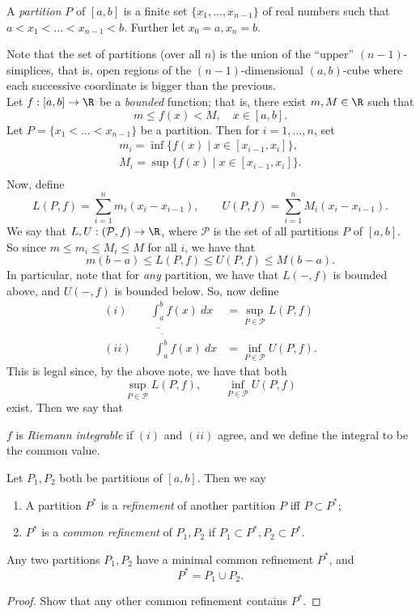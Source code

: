 \documentclass{notes}
\begin{document}
\begin{defn}
  A \emph{partition} $P$ of $[a,b]$ is a finite set $\{x_1, \dots, x_{n-1}\}$ of real numbers such
  that $a < x_1 < \dots < x_{n-1} < b$. Further let $x_0 = a, x_n = b$.
\end{defn}
Note that the set of partitions (over all $n$) is the union of the ``upper'' $(n-1)$-simplices, that
is, open regions of the $(n-1)$-dimensional $(a,b)$-cube where each successive coordinate is bigger
than the previous. \\

Let $f: [a,b] \to \R$ be a \emph{bounded} function; that is, there exist $m, M\in\R$ such that 
$$m \leq f(x) < M, \quad x\in[a,b].$$
Let $P = \{x_1 < \dots < x_{n-1}\}$ be a partition. Then for $i=1, \dots, n$, set 
\begin{gather*}
  m_i = \inf \{f(x) \mid x\in [x_{i-1}, x_i] \}, \\
  M_i = \sup \{f(x) \mid x\in [x_{i-1}, x_i] \}. \\
\end{gather*}
Now, define 
$$L(P, f) = \sum_{i=1}^n m_i (x_i - x_{i-1}), \qquad U(P, f) = \sum_{i=1}^n M_i (x_i - x_{i-1}).$$
We say that $L, U: (\mathcal{P}, f) \to \R$, where $\mathcal{P}$ is the set of all partitions $P$ of
$[a,b]$.  So since $m \leq m_i \leq M_i \leq M$ for all $i$, we have that 
$$m(b-a) \leq L(P, f) \leq U(P, f) \leq M(b-a).$$
In particular, note that for \emph{any} partition, we have that $L(-, f)$ is bounded above, and
$U(-, f)$ is bounded below. So, now define
\begin{align*}
  (i)\qquad  \underline{\int_a^b} f(x)\ dx &= \sup_{P\in\mathcal{P}} L(P, f) \\
  (ii)\qquad  \overline{\int_a^b} f(x)\ dx &= \inf_{P\in\mathcal{P}} U(P, f).
\end{align*}
This is legal since, by the above note, we have that both
$$\sup_{P\in\mathcal{P}} L(P, f), \qquad \inf_{P\in\mathcal{P}} U(P, f)$$
exist.  Then we say that 
\begin{defn}
  $f$ is \emph{Riemann integrable} if $(i)$ and $(ii)$ agree, and we define the integral to be the
  common value.
\end{defn}

\begin{defn}[Refinements]
  Let $P_1, P_2$ both be partitions of $[a,b]$. Then we say 
  \begin{enumerate}
    \item A partition $P^*$ is a \emph{refinement} of another partition $P$ iff $P \subset P^*$;
    \item $P^*$ is a \emph{common refinement} of $P_1, P_2$ if $P_1 \subset P^*, P_2 \subset P^*$.
  \end{enumerate}
\end{defn}
\begin{proposition}
  Any two partitions $P_1, P_2$ have a minimal common refinement $P^*$, and $$P^* = P_1 \cup P_2.$$
\end{proposition}
\begin{proof}
  Show that any other common refinement contains $P^*$.
\end{proof}
\end{document}
